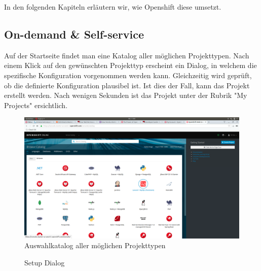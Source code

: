 \documentclass[12pt,a4paper]{article}
\begin{document}
In den folgenden Kapiteln erläutern wir, wie Openshift diese umsetzt.

\subsection{On-demand \& Self-service}

Auf der Startseite findet man eine Katalog aller möglichen Projekttypen. Nach einem Klick auf den gewünschten Projekttyp erscheint ein Dialog, in welchem die spezifische Konfiguration vorgenommen werden kann. Gleichzeitig wird geprüft, ob die definierte Konfiguration plausibel ist. Ist dies der Fall, kann das Projekt erstellt werden.
Nach wenigen Sekunden ist das Projekt unter der Rubrik "My Projects" ersichtlich.

\begin{figure}[h]
	\centering
	\includegraphics[width=0.7\linewidth]{img/os-overview-catalog}
	\caption{Auswahlkatalog aller möglichen Projekttypen}
	\label{fig:os-catalog}
\end{figure}

\begin{figure}%
    \centering
    \qquad
    \caption{Setup Dialog}%
    \label{fig:os-setup}%
\end{figure}
\end{document}
